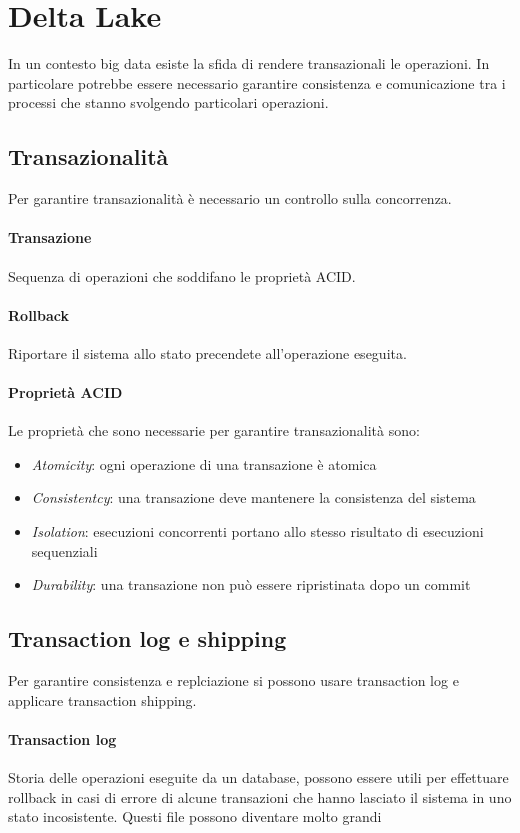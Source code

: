 \section{Delta Lake}
In un contesto big data esiste la sfida di rendere transazionali le operazioni.
In particolare potrebbe essere necessario garantire consistenza e comunicazione tra
i processi che stanno svolgendo particolari operazioni.

\subsection{Transazionalità}
Per garantire transazionalità è necessario un controllo sulla concorrenza.

\paragraph{Transazione}
Sequenza di operazioni che soddifano le proprietà ACID.

\paragraph{Rollback}
Riportare il sistema allo stato precendete all'operazione eseguita.

\paragraph{Proprietà ACID}
Le proprietà che sono necessarie per garantire transazionalità sono:
\begin{itemize}
    \item \emph{Atomicity}: ogni operazione di una transazione è atomica
    \item \emph{Consistentcy}: una transazione deve mantenere la consistenza del sistema
    \item \emph{Isolation}: esecuzioni concorrenti portano allo stesso risultato di esecuzioni sequenziali
    \item \emph{Durability}: una transazione non può essere ripristinata dopo un commit
\end{itemize}

\subsection{Transaction log e shipping}
Per garantire consistenza e replciazione si possono usare transaction log e applicare
transaction shipping.

\paragraph{Transaction log} 
Storia delle operazioni eseguite da un database, possono essere utili per effettuare
rollback in casi di errore di alcune transazioni che hanno lasciato
il sistema in uno stato incosistente. Questi file possono diventare molto grandi

